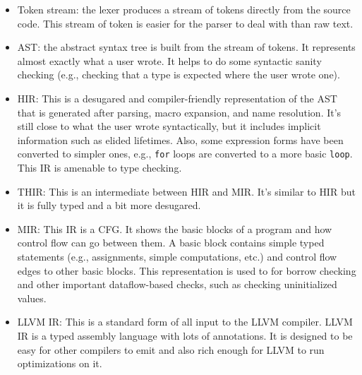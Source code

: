 \documentclass{article}
\begin{document}
\begin{itemize}
    \item Token stream: the lexer produces a stream of tokens directly from the source code. This stream of token is easier for the parser to deal with than raw text.
    \item \ac{AST}: the abstract syntax tree is built from the stream of tokens. It represents almost exactly what a user wrote. It helps to do some syntactic sanity checking (e.g., checking that a type is expected where the user wrote one).
    \item \ac{HIR}: This is a desugared and compiler-friendly representation of the \ac{AST} that is generated after parsing, macro expansion, and name resolution. It's still close to what the user wrote syntactically, but it includes implicit information such as elided lifetimes. Also, some expression forms have been converted to simpler ones, e.g., \lstinline{for} loops are converted to a more basic \lstinline{loop}. This \ac{IR} is amenable to type checking.
    \item \ac{THIR}: This is an intermediate between \ac{HIR} and \ac{MIR}. It's similar to \ac{HIR} but it is fully typed and a bit more desugared.
    \item \ac{MIR}: This \ac{IR} is a \ac{CFG}. It shows the basic blocks of a program and how control flow can go between them. A basic block contains simple typed statements (e.g., assignments, simple computations, etc.) and control flow edges to other basic blocks. This representation is used to for borrow checking and other important dataflow-based checks, such as checking uninitialized values.
    \item LLVM \ac{IR}: This is a standard form of all input to the LLVM compiler. LLVM \ac{IR} is a typed assembly language with lots of annotations. It is designed to be easy for other compilers to emit and also rich enough for LLVM to run optimizations on it.
\end{itemize}
\end{document}
